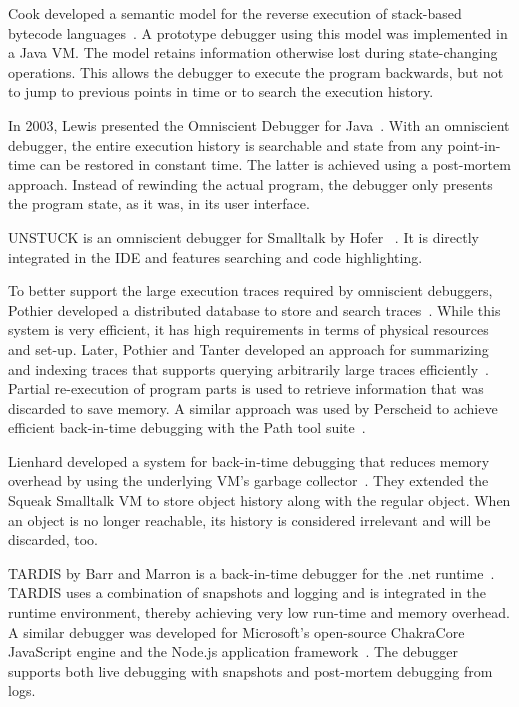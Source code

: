 Cook developed a semantic model for the reverse execution of stack-based bytecode languages~\cite{cook02:reverse_execution_of_java}.
A prototype debugger using this model was implemented in a Java VM.
The model retains information otherwise lost during state-changing operations.
This allows the debugger to execute the program backwards, but not to jump to previous points in time or to search the execution history.

In 2003, Lewis presented the Omniscient Debugger for Java~\cite{lewis03:debugging_backwards_in_time}.
With an omniscient debugger, the entire execution history is searchable and state from any point-in-time can be restored in constant time.
The latter is achieved using a post-mortem approach.
Instead of rewinding the actual program, the debugger only presents the program state, as it was, in its user interface.

UNSTUCK is an omniscient debugger for Smalltalk by Hofer \etal~\cite{hofer06:design_and_implementation}.
It is directly integrated in the IDE and features searching and code highlighting.

To better support the large execution traces required by omniscient debuggers, Pothier \etal developed a distributed database to store and search traces~\cite{pothier07:scalable_omniscient_debugging}.
While this system is very efficient, it has high requirements in terms of physical resources and set-up.
Later, Pothier and Tanter developed an approach for summarizing and indexing traces that supports querying arbitrarily large traces efficiently~\cite{pothier11:summarized_trace_indexing}.
Partial re-execution of program parts is used to retrieve information that was discarded to save memory.
A similar approach was used by Perscheid to achieve efficient back-in-time debugging with the Path tool suite~\cite{perscheid13:test-driven_fault_navigation}.

Lienhard \etal developed a system for back-in-time debugging that reduces memory overhead by using the underlying VM's garbage collector~\cite{lienhard08:practical_object-oriented_back-in-time_debugging}.
They extended the Squeak Smalltalk VM to store object history along with the regular object.
When an object is no longer reachable, its history is considered irrelevant and will be discarded, too.

TARDIS by Barr and Marron is a back-in-time debugger for the .net runtime~\cite{barr14:tardis_affordable_time-travel_debugging}.
TARDIS uses a combination of snapshots and logging and is integrated in the runtime environment, thereby achieving very low run-time and memory overhead.
A similar debugger was developed for Microsoft’s open-source ChakraCore JavaScript engine and the Node.js application framework~\cite{barr16:time-travel_debugging_for_javascriptnode}.
The debugger supports both live debugging with snapshots and post-mortem debugging from logs.

